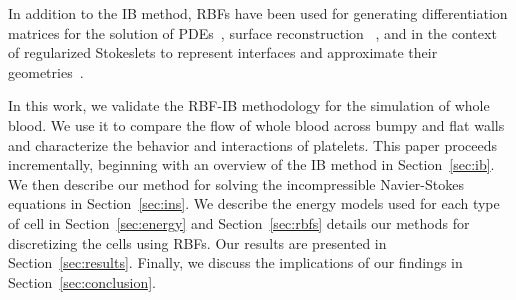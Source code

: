 In addition to the IB method, RBFs have been used for generating differentiation matrices
for the solution of PDEs~\cite{Fasshauer:2007ui}, surface reconstruction~%
\cite{Hardy:1971tb,Carr:2001tb}, and in the context of regularized Stokeslets to
represent interfaces and approximate their geometries~\cite{Olson:2015ja}.

In this work, we validate the RBF-IB methodology for the simulation of whole blood. We
use it to compare the flow of whole blood across bumpy and flat walls and characterize
the behavior and interactions of platelets. This paper proceeds incrementally, beginning
with an overview of the IB method in Section~\ref{sec:ib}. We then describe our method
for solving the incompressible Navier-Stokes equations in Section~\ref{sec:ins}. We
describe the energy models used for each type of cell in Section~\ref{sec:energy} and
Section~\ref{sec:rbfs} details our methods for discretizing the cells using RBFs. Our
results are presented in Section~\ref{sec:results}.  Finally, we discuss the implications
of our findings in Section~\ref{sec:conclusion}.

